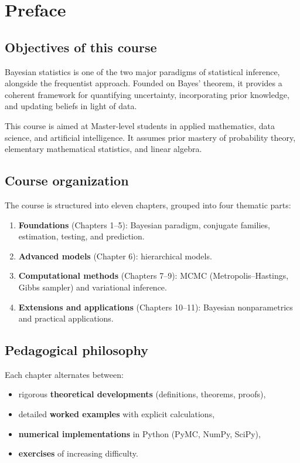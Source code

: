 \chapter*{Preface}

\section*{Objectives of this course}

Bayesian statistics is one of the two major paradigms of statistical
inference, alongside the frequentist approach. Founded on Bayes'
theorem, it provides a coherent framework for quantifying uncertainty,
incorporating prior knowledge, and updating beliefs in light of data.

This course is aimed at Master-level students in applied mathematics,
data science, and artificial intelligence. It assumes prior mastery of
probability theory, elementary mathematical statistics, and linear
algebra.

\section*{Course organization}

The course is structured into eleven chapters, grouped into four
thematic parts:

\begin{enumerate}
  \item \textbf{Foundations} (Chapters 1--5): Bayesian paradigm,
        conjugate families, estimation, testing, and prediction.
  \item \textbf{Advanced models} (Chapter 6): hierarchical models.
  \item \textbf{Computational methods} (Chapters 7--9): MCMC
        (Metropolis--Hastings, Gibbs sampler) and variational inference.
  \item \textbf{Extensions and applications} (Chapters 10--11):
        Bayesian nonparametrics and practical applications.
\end{enumerate}

\section*{Pedagogical philosophy}

Each chapter alternates between:
\begin{itemize}
  \item rigorous \textbf{theoretical developments} (definitions,
        theorems, proofs),
  \item detailed \textbf{worked examples} with explicit calculations,
  \item \textbf{numerical implementations} in Python (PyMC, NumPy,
        SciPy),
  \item \textbf{exercises} of increasing difficulty.
\end{itemize}

